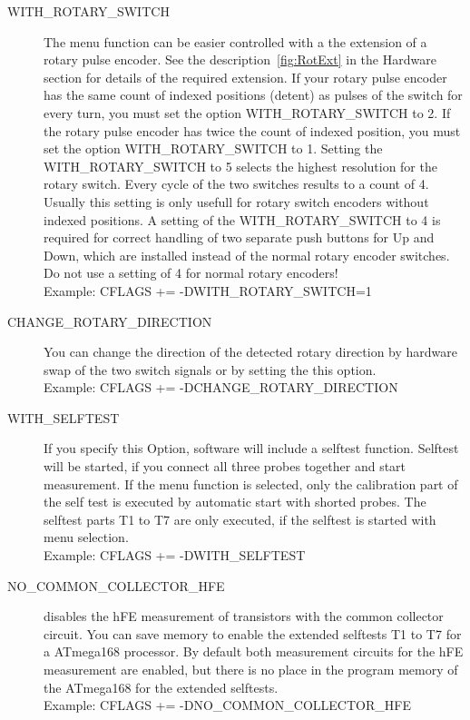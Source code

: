\begin{description}
  \item[WITH\_ROTARY\_SWITCH] The menu function can be easier controlled with a the extension of a rotary pulse encoder.
See the description~\ref{fig:RotExt} in the Hardware section for details of the required extension.
If your rotary pulse encoder has the same count of indexed positions (detent) as pulses of the switch for every turn, you must
set the  option WITH\_ROTARY\_SWITCH to 2. If the rotary pulse encoder has twice the count of indexed position, you must
set the option WITH\_ROTARY\_SWITCH to 1.
Setting the WITH\_ROTARY\_SWITCH to 5 selects the highest resolution for the rotary switch. Every cycle of the two switches results
to a count of 4. Usually this setting is only usefull for rotary switch encoders without indexed positions.
A setting of the WITH\_ROTARY\_SWITCH to 4 is required for correct handling of two separate push buttons for Up and Down,
which are installed instead of the normal rotary encoder switches.
Do not use a setting of 4 for normal rotary encoders!\\
Example: CFLAGS += -DWITH\_ROTARY\_SWITCH=1

  \item[CHANGE\_ROTARY\_DIRECTION] You can change the direction of the detected rotary direction by hardware swap of
the two switch signals or by setting the this option.\\
Example: CFLAGS += -DCHANGE\_ROTARY\_DIRECTION

  \item[WITH\_SELFTEST] If you specify this Option, software will include a selftest function.
Selftest will be started, if you connect all three probes together and start measurement.
If the menu function is selected, only the calibration part of the self test is executed by automatic start with
shorted probes. The selftest parts T1 to T7 are only executed, if the selftest is started with menu selection.\\
Example: CFLAGS += -DWITH\_SELFTEST

  \item[NO\_COMMON\_COLLECTOR\_HFE] disables the hFE measurement of transistors with the common collector circuit.
You can save memory to enable the extended selftests T1 to T7 for a ATmega168 processor.
By default both measurement circuits for the hFE measurement are enabled, 
but there is no place in the program memory of the ATmega168 for the extended selftests.\\
Example: CFLAGS += -DNO\_COMMON\_COLLECTOR\_HFE


\end{description}
